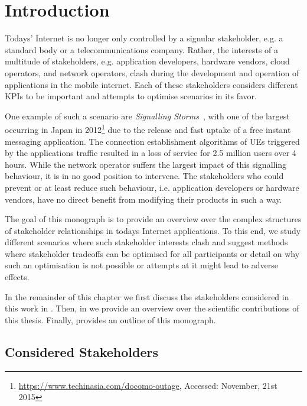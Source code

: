 \chapter{Introduction}\label{chap:introduction}

Todays' Internet is no longer only controlled by a signular stakeholder, e.g. a standard body or a telecommunications company.
Rather, the interests of a multitude of stakeholders, e.g. application developers, hardware vendors, cloud operators, and network operators, clash during the development and operation of applications in the mobile internet. 
Each of these stakeholders considers different \glspl{KPI} to be important and attempts to optimise scenarios in its favor. 

One example of such a scenario are \emph{Signalling Storms}~\cite{Huawei2011}, with one of the largest occurring in Japan in 2012\footnote{\url{https://www.techinasia.com/docomo-outage}, Accessed: November, 21st 2015} due to the release and fast uptake of a free instant messaging application.
The connection establishment algorithms of \glspl{UE} triggered by the applications traffic resulted in a loss of service for 2.5 million users over 4 hours.
While the network operator suffers the largest impact of this signalling behaviour, it is in no good position to intervene.
The stakeholders who could prevent or at least reduce such behaviour, i.e. application developers or hardware vendors, have no direct benefit from modifying their products in such a way.  

The goal of this monograph is to provide an overview over the complex structures of stakeholder relationships in todays Internet applications.
To this end, we study different scenarios where such stakeholder interests clash and suggest methods where stakeholder tradeoffs can be optimised for all participants or detail on why such an optimisation is not possible or attempts at it might lead to adverse effects.

In the remainder of this chapter we first discuss the stakeholders considered in this work in .
Then, in  we provide an overview over the scientific contributions of this thesis.
Finally,  provides an outline of this monograph.

\section{Considered Stakeholders}\label{sec:introduction:considered_stakeholders}

